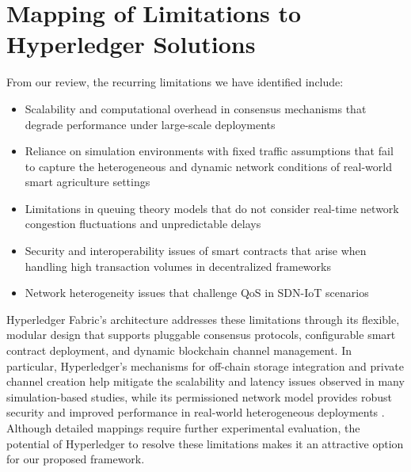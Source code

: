 \documentclass[12pt,onecolumn]{IEEEtran} %
\begin{document}
\section*{Mapping of Limitations to Hyperledger Solutions}
From our review, the recurring limitations we have identified include: 
\begin{itemize}
\item Scalability and computational overhead in consensus mechanisms that degrade performance under large-scale deployments \cite{agrawal2022mlsmbqsdesignof,haque2024ascalableblockchain}
\item Reliance on simulation environments with fixed traffic assumptions that fail to capture the heterogeneous and dynamic network conditions of real-world smart agriculture settings \cite{habeeb2022dynamicbandwidthslicing,zhang2024ondemandcentralizedresource}
\item Limitations in queuing theory models that do not consider real-time network congestion fluctuations and unpredictable delays \cite{habeeb2022dynamicbandwidthslicing,zhang2024ondemandcentralizedresource}
\item Security and interoperability issues of smart contracts that arise when handling high transaction volumes in decentralized frameworks \cite{gupta2025enhancingblockchainqualityofservice}
\item Network heterogeneity issues that challenge QoS in SDN-IoT scenarios \cite{zafar2023anadvancedstrategy}
\end{itemize}

Hyperledger Fabric's architecture addresses these limitations through its flexible, modular design that supports pluggable consensus protocols, configurable smart contract deployment, and dynamic blockchain channel management. In particular, Hyperledger's mechanisms for off-chain storage integration and private channel creation help mitigate the scalability and latency issues observed in many simulation-based studies, while its permissioned network model provides robust security and improved performance in real-world heterogeneous deployments \cite{pajooh2022experimentalperformanceanalysis}. Although detailed mappings require further experimental evaluation, the potential of Hyperledger to resolve these limitations makes it an attractive option for our proposed framework.
\end{document}
